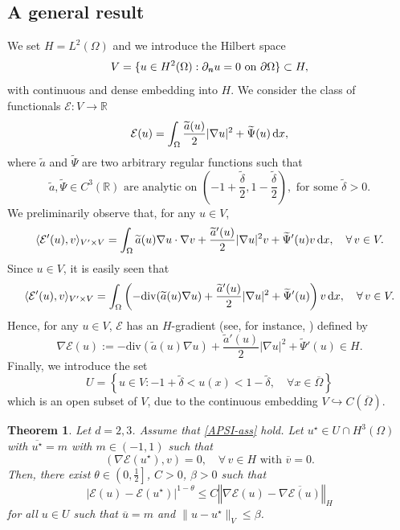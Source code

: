 \documentclass[11pt,reqno]{amsart}
\newtheorem{theorem}{Theorem}[section]
\theoremstyle{remark}
\newcommand \norm[1] {\left\Vert #1\right\Vert}
\def\n{\textbf{\textit{n}}}
\def\R{\mathbb{R}}
\def\d{{\rm d}}
\def\E{\mathcal{E}}
\def\div{\mathrm{div}}
\numberwithin{equation}{section}
\def\d{{\rm d}}
\begin{document}
\subsection{A general result}
We set $H=L^2(\Omega)$ and we introduce the Hilbert space
$$
V=\{u\in H^2(\Omega):\partial_\n u=0\text{ on }\partial\Omega\}\subset H,
$$
with continuous and dense embedding into $H$.
We consider the class of functionals $\E:V\to \R$
$$
\E(u)=\int_\Omega \frac{\widetilde{a}(u)}{2}|\nabla u|^2+\widetilde{\Psi}(u) \, \d x,
$$
where $\widetilde{a}$ and $\widetilde{\Psi}$ are two arbitrary regular functions such that
\begin{equation}
\label{APSI-ass}
\widetilde{a},\widetilde{\Psi}\in C^3(\R) \text{ are analytic on }
\left(-1+\frac{\widetilde{\delta}}{2},1-\frac{\widetilde{\delta}}{2} \right) \!, \text{ for some $\widetilde{\delta}>0$.}
\end{equation}
We preliminarily observe that, for any $u \in V$,
$$
\langle \E'(u),v \rangle_{V' \times V}=
\int_{\Omega} \widetilde{a}(u)\nabla u\cdot \nabla v+\frac{\widetilde{a}'(u)}{2} |\nabla u|^2v +\widetilde{\Psi}'(u) v\, \d x, \quad \forall \, v \in V.
$$
Since $u \in V$, it is easily seen that
$$
\langle \E'(u),v \rangle_{V' \times V}=
\int_{\Omega} \left(-\div(\widetilde{a}(u)\nabla u)+\frac{\widetilde{a}'(u)}{2} |\nabla u|^2+\widetilde{\Psi}'(u)\right)v \, \d x, \quad \forall \, v \in V.
$$
Hence, for any $u\in V$, $\E$ has an $H$-gradient (see, for instance, \cite[Definition 5.1]{RUPP}) defined by
\begin{equation}
\label{GRAD-E}
\nabla \E(u):=-\div(\widetilde{a}(u)\nabla u)+\frac{\widetilde{a}'(u)}{2} |\nabla u|^2+\widetilde{\Psi}'(u) \in H.
\end{equation}
Finally, we introduce the set
$$
U=\left\{u\in V:-1+\widetilde{\delta}<u(x)<1-\widetilde{\delta},\quad \forall x\in \overline{\Omega}\right\}
$$
which is an open subset of $V$, due to the continuous embedding $V\hookrightarrow C(\overline{\Omega})$.

\begin{theorem}
\label{LS}
Let $d=2,3$. Assume that \eqref{APSI-ass} hold.
Let $u^\star \in U \cap H^3(\Omega)$ with $\overline{u^\star}=m$ with $m \in (-1,1)$ such that
\begin{equation}
\label{LS-cp}
( \nabla \E (u^\star), v ) =0, \quad \forall \, v \in H \text{ with } \overline{v}=0.
\end{equation}
Then, there exist $\theta \in \left(0,\frac12\right]$, $C>0$, $\beta>0$ such that
\begin{equation}
\label{LS-formula}
| \E(u) - \E(u^\star)|^{1-\theta}
\leq C \norm{\nabla \E(u) -\overline{\nabla \E(u)}}_{H}
\end{equation}
for all $u\in U$ such that $\overline{u}=m$ and
$\| u-u^\star\|_{V}\leq \beta$.
\end{theorem}
\end{document}
